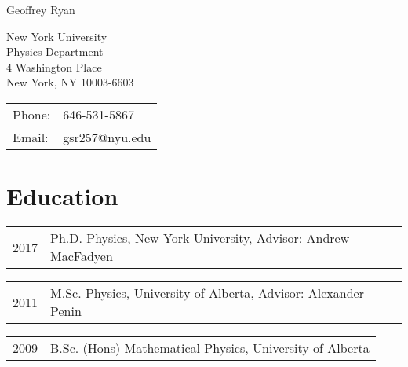 \documentclass[letterpaper]{article}
\def\name{Geoffrey Ryan}
\renewenvironment{itemize}{
  \begin{list}{}{
    \setlength{\leftmargin}{1.5em}
  }
}{
  \end{list}
}
\begin{document}
{\huge \name}


\vspace{0.25in}

\begin{minipage}{0.45\linewidth}
  New York University \\
  Physics Department\\
  4 Washington Place\\
  New York, NY 10003-6603
\end{minipage}
\begin{minipage}{0.45\linewidth}
  \begin{tabular}{ll}
    Phone: & 646-531-5867 \\
    Email: &  gsr257@nyu.edu \\
  \end{tabular}
\end{minipage}

\section*{Education}
\begin{itemize}
\item \begin{tabular}{ll}
2017 & Ph.D. Physics, New York University, Advisor: Andrew MacFadyen \\
\end{tabular}

\item \begin{tabular}{ll}
2011 &  M.Sc. Physics, University of Alberta, Advisor: Alexander Penin \\
\end{tabular}

\item \begin{tabular}{ll}
2009 &  B.Sc. (Hons) Mathematical Physics, University of Alberta \\
\end{tabular}
\end{itemize}

\end{document}
